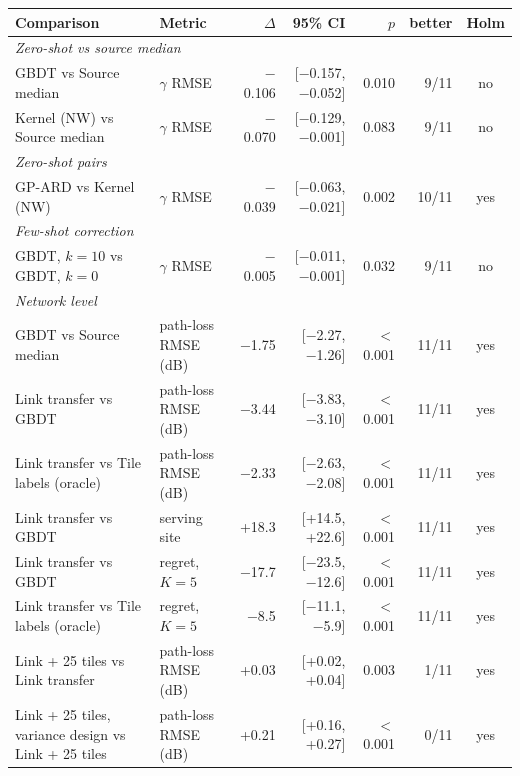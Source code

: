 \begin{tabular}{llrrrrc}
\toprule
Comparison & Metric & $\Delta$ & 95\% CI & $p$ & better & Holm \\
\midrule
\multicolumn{7}{l}{\emph{Zero-shot vs source median}} \\
GBDT vs Source median & $\gamma$ RMSE & \ensuremath{-}0.106 & [\ensuremath{-}0.157, \ensuremath{-}0.052] & 0.010 & 9/11 & no \\
Kernel (NW) vs Source median & $\gamma$ RMSE & \ensuremath{-}0.070 & [\ensuremath{-}0.129, \ensuremath{-}0.001] & 0.083 & 9/11 & no \\
\multicolumn{7}{l}{\emph{Zero-shot pairs}} \\
GP-ARD vs Kernel (NW) & $\gamma$ RMSE & \ensuremath{-}0.039 & [\ensuremath{-}0.063, \ensuremath{-}0.021] & 0.002 & 10/11 & yes \\
\multicolumn{7}{l}{\emph{Few-shot correction}} \\
GBDT, $k{=}10$ vs GBDT, $k{=}0$ & $\gamma$ RMSE & \ensuremath{-}0.005 & [\ensuremath{-}0.011, \ensuremath{-}0.001] & 0.032 & 9/11 & no \\
\multicolumn{7}{l}{\emph{Network level}} \\
GBDT vs Source median & path-loss RMSE (dB) & \ensuremath{-}1.75 & [\ensuremath{-}2.27, \ensuremath{-}1.26] & $<$0.001 & 11/11 & yes \\
Link transfer vs GBDT & path-loss RMSE (dB) & \ensuremath{-}3.44 & [\ensuremath{-}3.83, \ensuremath{-}3.10] & $<$0.001 & 11/11 & yes \\
Link transfer vs Tile labels (oracle) & path-loss RMSE (dB) & \ensuremath{-}2.33 & [\ensuremath{-}2.63, \ensuremath{-}2.08] & $<$0.001 & 11/11 & yes \\
Link transfer vs GBDT & serving site & +18.3 & [+14.5, +22.6] & $<$0.001 & 11/11 & yes \\
Link transfer vs GBDT & regret, $K{=}5$ & \ensuremath{-}17.7 & [\ensuremath{-}23.5, \ensuremath{-}12.6] & $<$0.001 & 11/11 & yes \\
Link transfer vs Tile labels (oracle) & regret, $K{=}5$ & \ensuremath{-}8.5 & [\ensuremath{-}11.1, \ensuremath{-}5.9] & $<$0.001 & 11/11 & yes \\
Link + 25 tiles vs Link transfer & path-loss RMSE (dB) & +0.03 & [+0.02, +0.04] & 0.003 & 1/11 & yes \\
Link + 25 tiles, variance design vs Link + 25 tiles & path-loss RMSE (dB) & +0.21 & [+0.16, +0.27] & $<$0.001 & 0/11 & yes \\

\end{tabular}
